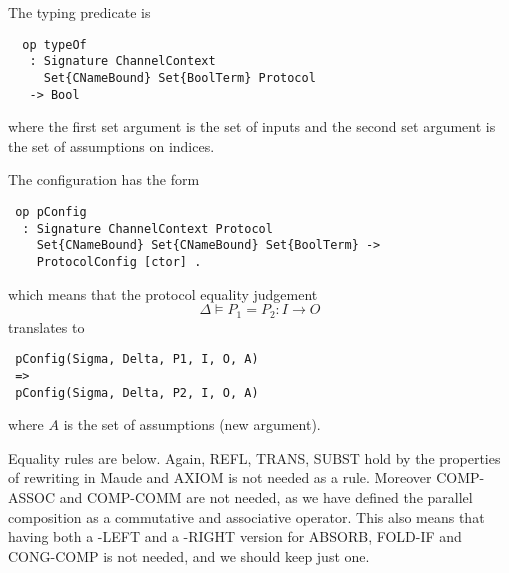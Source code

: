 \documentclass{article}
\begin{document}
The typing predicate is
\begin{lstlisting}
  op typeOf 
   : Signature ChannelContext 
     Set{CNameBound} Set{BoolTerm} Protocol 
   -> Bool 
\end{lstlisting}
\noindent where the first set argument is the set of inputs 
and the second set argument is the set of assumptions on indices.

The configuration has the form
\begin{lstlisting}
 op pConfig 
  : Signature ChannelContext Protocol 
    Set{CNameBound} Set{CNameBound} Set{BoolTerm} -> 
    ProtocolConfig [ctor] .
\end{lstlisting}

\noindent which means that the protocol equality judgement
$$\Delta \vDash P_1 = P_2 : I \rightarrow O$$
translates to
\begin{lstlisting}
 pConfig(Sigma, Delta, P1, I, O, A)
 =>
 pConfig(Sigma, Delta, P2, I, O, A) 
\end{lstlisting}
\noindent where $A$ is the set of assumptions (new argument).

Equality rules are below. Again,
 REFL, TRANS, SUBST hold by the properties of rewriting in Maude and
 AXIOM is not needed as a rule. Moreover COMP-ASSOC and COMP-COMM are not needed,
 as we have defined the parallel composition as a commutative and associative 
 operator. This also means that having both a -LEFT and a -RIGHT version for 
 ABSORB, FOLD-IF and CONG-COMP is not needed, and we should keep just one.
 
\end{document}
